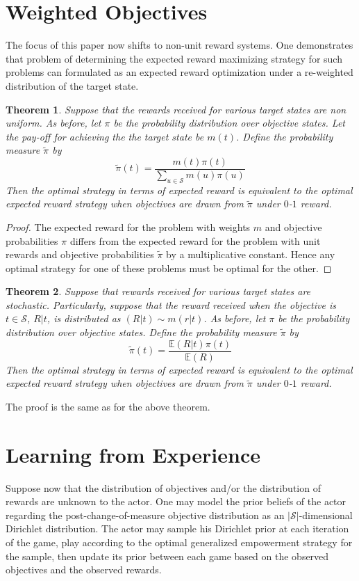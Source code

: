 \documentclass{article}
\newtheorem{theorem}{Theorem}
\newcommand{\EE}{\mathbb{E}}
\newcommand{\Ss}{\mathcal{S}}
\begin{document}
\section{Weighted Objectives}
The focus of this paper now shifts to non-unit reward systems. One demonstrates that problem of determining the expected reward maximizing strategy for such problems can formulated as an expected reward optimization under a re-weighted distribution of the target state.\\

\begin{theorem}
Suppose that the rewards received for various target states are non uniform. As before, let $\pi$ be the probability distribution over objective states. 
Let the pay-off for achieving the the target state be $m(t)$. 
Define the probability measure $\tilde{\pi}$ by
\[\tilde{\pi}(t)=\frac{m(t)\pi(t)}{\sum_{u\in\Ss} m(u)\pi(u)}\] 
Then the optimal strategy in terms of expected reward is equivalent to the optimal expected reward strategy when objectives are drawn from $\tilde{\pi}$ under $0$-$1$ reward.
\end{theorem}
\begin{proof}
The expected reward for the problem with weights $m$ and objective probabilities $\pi$ differs from the expected reward for the problem with unit rewards and objective probabilities $\tilde{\pi}$ by a multiplicative constant. Hence any optimal strategy for one of these problems must be optimal for the other. 
\end{proof}
\begin{theorem} 
Suppose that rewards received for various target states are stochastic. Particularly, suppose that the reward received when the objective is $t\in\Ss$, $R|t$, is distributed as $(R|t)\sim m(r|t)$. As before, let $\pi$ be the probability distribution over objective states. Define the probability measure $\tilde{\pi}$ by
\[\tilde{\pi}(t)=\frac{\EE(R|t)\pi(t)}{\EE(R)}\] 
Then the optimal strategy in terms of expected reward is equivalent to the optimal expected reward strategy when objectives are drawn from $\tilde{\pi}$ under $0$-$1$ reward.
\end{theorem}
The proof is the same as for the above theorem.



\section{Learning from Experience}
Suppose now that the distribution of objectives and/or the distribution of rewards are unknown to the actor. 
One may model the prior beliefs of the actor regarding the post-change-of-measure objective distribution as an $|\Ss|$-dimensional Dirichlet distribution. 
The actor may sample his Dirichlet prior at each iteration of the game, play according to the optimal generalized empowerment strategy for the sample, then update its prior between each game based on the observed objectives and the observed rewards.


\newpage


\end{document}

